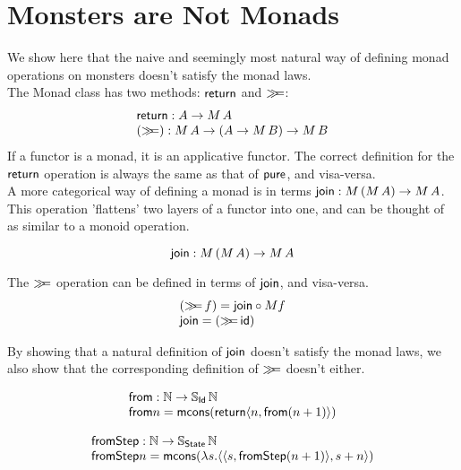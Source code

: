 \section{Monsters are Not Monads}



We show here that the naive and seemingly most natural way of defining monad operations on monsters doesn't satisfy the monad laws. \\

The Monad class has two methods: $\mathsf{return}$ and $\mathbin{\gg\!\!=}$:
$$
\begin{array}{l}
\mathsf{return} : A \rightarrow M\, A \\
(\mathbin{\gg\!\!=}) : M\, A \rightarrow (A \rightarrow M\, B) \rightarrow M\, B
\end{array}
$$
If a functor is a monad, it is an applicative functor. The correct definition for the $\mathsf{return}$ operation is always the same as that of $\mathsf{pure}$, and visa-versa. \\

A more categorical way of defining a monad is in terms $\mathsf{join} : M\,(M\, A) \rightarrow M\, A$. This operation 'flattens' two layers of a functor into one, and can be thought of as similar to a monoid operation.

$$
\mathsf{join} : M\,(M\, A) \rightarrow M\, A
$$

The $\mathbin{\gg\!\!=}$ operation can be defined in terms of $\mathsf{join}$, and visa-versa.
$$
\begin{array}{l}
(\mathbin{\gg\!\!=}\, f) = \mathsf{join} \circ M f \\
\mathsf{join} = (\mathbin{\gg\!\!=}\,\mathsf{id})
\end{array}
$$

By showing that a natural definition of $\mathsf{join}$ doesn't satisfy the monad laws, we also show that the corresponding definition of $\mathbin{\gg\!\!=}$ doesn't either. 

$$
\begin{array}{l}
\mathsf{from} : \mathbb{N} \rightarrow \mathbb{S}_{\mathsf{Id}}\,\mathbb{N} \\
\mathsf{from} n = \mathsf{mcons} (\mathsf{return} \langle n, \mathsf{from} (n + 1) \rangle)
\end{array}
$$

$$
\begin{array}{l}
\mathsf{fromStep} : \mathbb{N} \rightarrow \mathbb{S}_{\mathsf{State}}\,\mathbb{N} \\
\mathsf{fromStep} n = \mathsf{mcons} (\lambda s. \langle \langle s, \mathsf{fromStep} (n + 1) \rangle, s + n \rangle)
\end{array}
$$